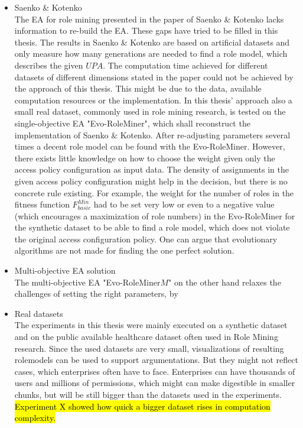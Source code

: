 \begin{itemize}
	
	\item Saenko \& Kotenko\\
	The EA for role mining presented in the paper of Saenko \& Kotenko lacks information to re-build the EA. These gaps have tried to be filled in this thesis.	The results in Saenko \& Kotenko are based on artificial datasets and only measure how many generations are needed to find a role model, which describes the given $UPA$. The computation time achieved for different datasets of different dimensions stated in the paper could not be achieved by the approach of this thesis. This might be due to the data, available computation resources or the implementation. In this thesis' approach also a small real dataset, commonly used in role mining research, is tested on the single-objective EA "Evo-RoleMiner", which shall reconstruct the implementation of Saenko \& Kotenko. After re-adjusting parameters several times a decent role model can be found with the Evo-RoleMiner. However, there exists little knowledge on how to choose the weight given only the access policy configuration as input data. The density of assignments in the given access policy configuration might help in the decision, but there is no concrete rule existing. For example, the weight for the number of roles in the fitness function $F_{basic}^{Min}$ had to be set very low or even to a negative value (which encourages a maximization of role numbers) in the Evo-RoleMiner for the synthetic dataset to be able to find a role model, which does not violate the original access configuration policy. One can argue that evolutionary algorithms are not made for finding the one perfect solution.
	
	\item Multi-objective EA solution\\
	The multi-objective EA "Evo-RoleMiner$M$" on the other hand relaxes the challenges of setting the right parameters, by 
	
    \item Real datasets\\
    The experiments in this thesis were mainly executed on a synthetic dataset and on the public available healthcare dataset often used in Role Mining research. Since the used datasets are very small, visualizations of resulting rolemodels can be used to support argumentations. But they might not reflect cases, which enterprises often have to face. Enterprises can have thousands of users and millions of permissions, which might can make digestible in smaller chunks, but will be still bigger than the datasets used in the experiments. \hl{Experiment X showed how quick a bigger dataset rises in computation complexity.}
    

\end{itemize}
